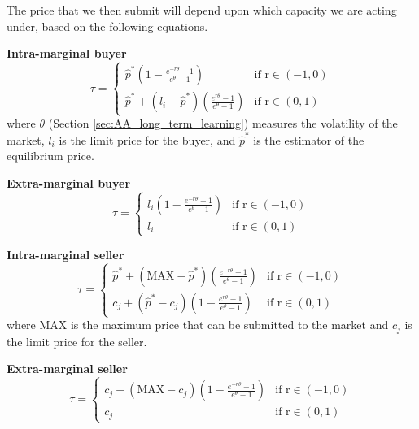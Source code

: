 \documentclass[preprint]{acm_proc_article-sp} %
\begin{document}
The price that we then submit will depend upon which capacity we are acting
under, based on the following equations.

\textbf{Intra-marginal buyer}
\begin{equation}
    \tau =
    \begin{cases}
        \hat{p}^*(1- \frac{e^{-r\theta}-1}{e^{\theta}-1}) &  \text{if r} \in (-1,0)  \\
        \hat{p}^* + (l_i-\hat{p}^*)(\frac{e^{r\theta}-1}{e^\theta-1}) & \text{if r} \in (0,1)
    \end{cases}
    \label{eqn:intrabuyer}
\end{equation}
where $\theta$ (Section \ref{sec:AA_long_term_learning}) measures the volatility of the
market, $l_i$ is the limit price for the buyer, and $\hat{p}^*$ is the estimator of the
equilibrium price.

\textbf{Extra-marginal buyer}
\begin{equation}
    \tau =
    \begin{cases}
        l_i(1-\frac{e^{-r\theta}-1}{e^\theta-1}) &  \text{if r} \in (-1,0)  \\
        l_i & \text{if r} \in (0,1)
    \end{cases}
    \label{eqn:extrabuyer}
\end{equation}

\textbf{Intra-marginal seller}
\begin{equation}
    \tau =
    \begin{cases}
        \hat{p}^* + (\text{MAX}-\hat{p}^*)( \frac{e^{-r\theta}-1}{e^{\theta}-1}) &  \text{if r} \in (-1,0)  \\
        c_j + (\hat{p}^*-c_j)(1-\frac{e^{r\theta}-1}{e^\theta-1}) & \text{if r} \in (0,1)
    \end{cases}
    \label{eqn:intraseller}
\end{equation}
where MAX is the maximum price that can be submitted to the market and $c_j$ is
the limit price for the seller.

\textbf{Extra-marginal seller}
\begin{equation}
    \tau =
    \begin{cases}
        c_j + (\text{MAX}-c_j)(1-\frac{e^{-r\theta}-1}{e^\theta-1}) &  \text{if r} \in (-1,0)  \\
        c_j & \text{if r} \in (0,1)
    \end{cases}
    \label{eqn:extraseller}
\end{equation}
\end{document}
